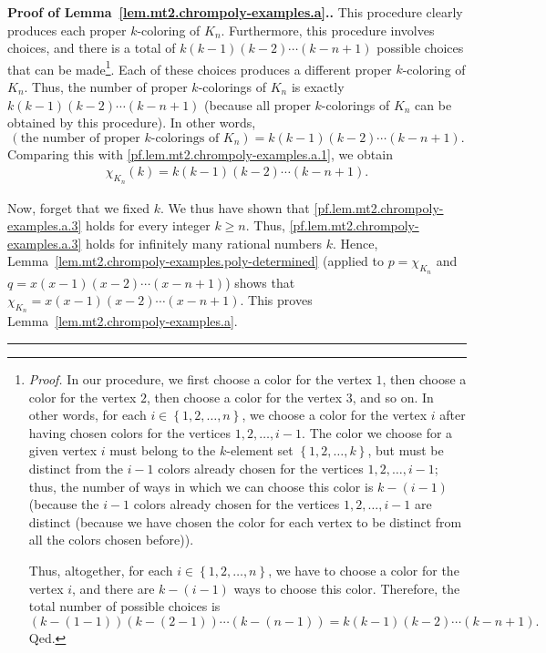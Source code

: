 \documentclass[numbers=enddot,12pt,final,onecolumn,notitlepage]{scrartcl}%
\theoremstyle{definition}
\newenvironment{proof}[1][Proof]{\noindent\textbf{#1.} }{\ \rule{0.5em}{0.5em}}
\newcommand{\set}[1]{\left\{ #1 \right\}}
\newcommand{\tup}[1]{\left( #1 \right)}
\begin{document}
\begin{proof}[Proof of Lemma~\ref{lem.mt2.chrompoly-examples.a}.]
This procedure clearly produces each proper $k$-coloring
of $K_n$.
Furthermore, this procedure involves choices, and there
is a total of
$k \tup{k-1} \tup{k-2} \cdots \tup{k-n+1}$
possible choices that can be made\footnote{\textit{Proof.}
  In our procedure, we first choose a color for the
  vertex $1$, then choose a color for the vertex $2$,
  then choose a color for the vertex $3$, and so on.
  In other words, for each $i \in \set{1, 2, \ldots, n}$,
  we choose a color for the vertex $i$ after having
  chosen colors for the vertices $1, 2, \ldots, i-1$.
  The color we choose for a given vertex $i$ must
  belong to the $k$-element set $\set{1, 2, \ldots, k}$,
  but must be distinct from the $i-1$ colors already
  chosen for the vertices $1, 2, \ldots, i-1$;
  thus, the number of ways in which we can choose this
  color is $k - \tup{i-1}$ (because the $i-1$ colors
  already chosen for the vertices $1, 2, \ldots, i-1$
  are distinct (because we have chosen the color for
  each vertex to be distinct from all the colors chosen
  before)).
  \par
  Thus, altogether, for each $i \in \set{1, 2, \ldots, n}$,
  we have to choose a color for the vertex $i$, and there
  are $k - \tup{i-1}$ ways to choose this color.
  Therefore, the total number of possible choices is
  \[
  \tup{k - \tup{1-1}} \tup{k - \tup{2-1}} \cdots \tup{k - \tup{n-1}}
  = k \tup{k-1} \tup{k-2} \cdots \tup{k-n+1}.
  \]
  Qed.}.
Each of these choices produces a different proper $k$-coloring
of $K_n$.
Thus, the number of proper $k$-colorings of $K_n$ is
exactly $k \tup{k-1} \tup{k-2} \cdots \tup{k-n+1}$
(because all proper $k$-colorings of $K_n$ can be
obtained by this procedure).
In other words,
\[
\tup{\text{the number of proper } k \text{-colorings of }
     K_n}
= k \tup{k-1} \tup{k-2} \cdots \tup{k-n+1} .
\]
Comparing this with
\eqref{pf.lem.mt2.chrompoly-examples.a.1}, we obtain
\begin{align}
\chi_{K_n} \tup{k}
= k \tup{k-1} \tup{k-2} \cdots \tup{k-n+1} .
\label{pf.lem.mt2.chrompoly-examples.a.3}
\end{align}

Now, forget that we fixed $k$.
We thus have shown that
\eqref{pf.lem.mt2.chrompoly-examples.a.3}
holds for every integer $k \geq n$.
Thus, \eqref{pf.lem.mt2.chrompoly-examples.a.3}
holds for infinitely many rational numbers $k$.
Hence, Lemma~\ref{lem.mt2.chrompoly-examples.poly-determined}
(applied to $p = \chi_{K_n}$ and
$q = x \tup{x-1} \tup{x-2} \cdots \tup{x-n+1}$)
shows that
$\chi_{K_n} = x \tup{x-1} \tup{x-2} \cdots \tup{x-n+1}$.
This proves
Lemma~\ref{lem.mt2.chrompoly-examples.a}.
\end{proof}
\end{document}
